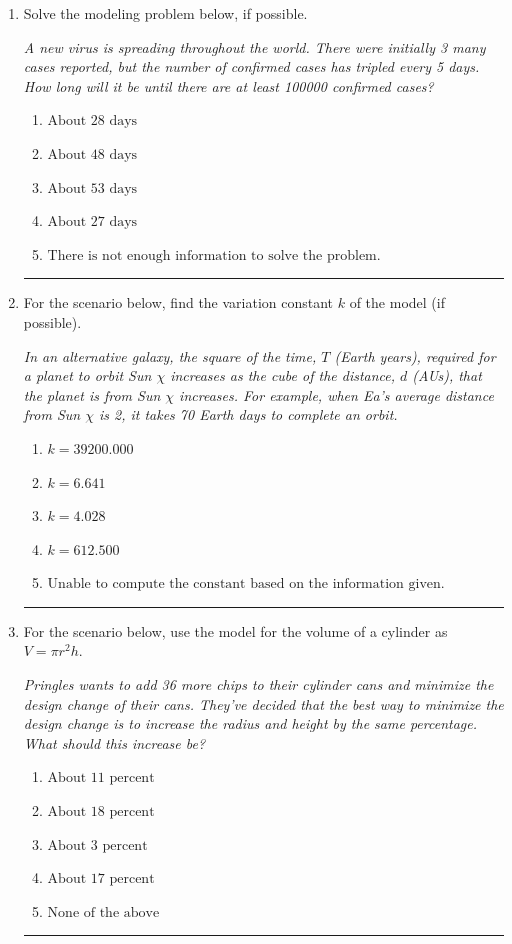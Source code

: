 \documentclass[14pt]{extbook}
\newcommand{\litem}[1]{\item#1\hspace*{-1cm}\rule{\textwidth}{0.4pt}}
\begin{document}
\begin{enumerate}
{\begin{enumerate}[label=\Alph*.]
\end{enumerate} }
\litem{
Solve the modeling problem below, if possible.
\begin{center}
    \textit{ A new virus is spreading throughout the world. There were initially 3 many cases reported, but the number of confirmed cases has tripled every 5 days. How long will it be until there are at least 100000 confirmed cases? }
\end{center}
\begin{enumerate}[label=\Alph*.]
\item \( \text{About } 28 \text{ days} \)
\item \( \text{About } 48 \text{ days} \)
\item \( \text{About } 53 \text{ days} \)
\item \( \text{About } 27 \text{ days} \)
\item \( \text{There is not enough information to solve the problem.} \)

\end{enumerate} }
\litem{
For the scenario below, find the variation constant $k$ of the model (if possible).
\begin{center}
    \textit{ In an alternative galaxy, the square of the time, $T$ (Earth years), required for a planet to orbit Sun $\chi$ increases as the cube of the distance, $d$ (AUs), that the planet is from Sun $\chi$ increases. For example, when Ea's average distance from Sun $\chi$ is 2, it takes 70 Earth days to complete an orbit. }
\end{center}
\begin{enumerate}[label=\Alph*.]
\item \( k = 39200.000 \)
\item \( k = 6.641 \)
\item \( k = 4.028 \)
\item \( k = 612.500 \)
\item \( \text{Unable to compute the constant based on the information given.} \)

\end{enumerate} }
\litem{
For the scenario below, use the model for the volume of a cylinder as $V = \pi r^2 h$.
\begin{center}
    \textit{ Pringles wants to add 36 \text{percent} more chips to their cylinder cans and minimize the design change of their cans. They've decided that the best way to minimize the design change is to increase the radius and height by the same percentage. What should this increase be? }
\end{center}
\begin{enumerate}[label=\Alph*.]
\item \( \text{About } 11 \text{ percent} \)
\item \( \text{About } 18 \text{ percent} \)
\item \( \text{About } 3 \text{ percent} \)
\item \( \text{About } 17 \text{ percent} \)
\item \( \text{None of the above} \)


\end{enumerate}}
\end{enumerate}
\end{document}
